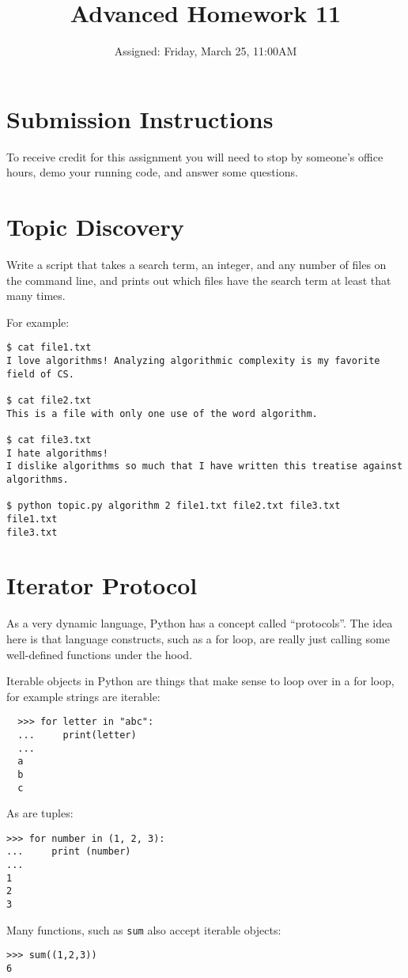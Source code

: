 \documentclass{article}
\begin{document}
\fancyfoot[C]{\color{gray} \thepage~/~\pageref*{LastPage}}
\pagestyle{fancyplain}


\title{\textbf{Advanced Homework 11\\}}
\author{Assigned: Friday, March 25, 11:00AM}
\date{\textbf{\color{red}{Due: Before the first lecture on Friday, April 8}}}
\maketitle


\section*{Submission Instructions}
To receive credit for this assignment you will need to stop by someone's
office hours, demo your running code, and answer some questions.

\section{Topic Discovery}
Write a script that takes a search term, an integer, and any number of files on
the command line, and prints out which files have the search term at least that
many times.

For example:

\begin{lstlisting}
$ cat file1.txt
I love algorithms! Analyzing algorithmic complexity is my favorite field of CS.

$ cat file2.txt
This is a file with only one use of the word algorithm.

$ cat file3.txt
I hate algorithms!
I dislike algorithms so much that I have written this treatise against algorithms.

$ python topic.py algorithm 2 file1.txt file2.txt file3.txt
file1.txt
file3.txt
\end{lstlisting}


\newpage
\section{Iterator Protocol}
As a very dynamic language, Python has a concept called ``protocols''. The
idea here is that language constructs, such as a for loop, are really just
calling some well-defined functions under the hood.

\medskip
\noindent
Iterable objects in Python are things that make sense to loop over in a for
loop, for example strings are iterable:
\begin{lstlisting}
  >>> for letter in "abc":
  ...     print(letter)
  ...
  a
  b
  c
\end{lstlisting}
As are tuples:
\begin{lstlisting}
>>> for number in (1, 2, 3):
...     print (number)
...
1
2
3
\end{lstlisting}
Many functions, such as \texttt{sum} also accept iterable objects:
\begin{lstlisting}
>>> sum((1,2,3))
6
\end{lstlisting}
\end{document}
